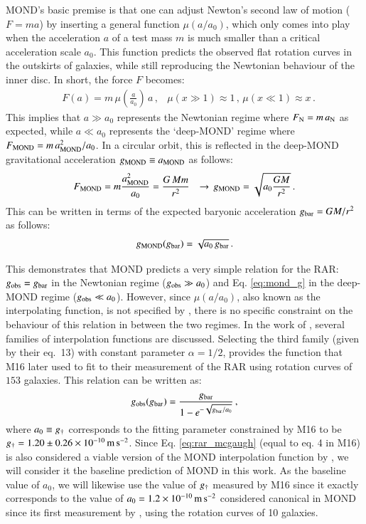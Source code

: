 \documentclass{aa}
\newcommand{\mpss}{\,{\rm m}\,{\rm s}^{-2} }
\newcommand*{\E}[1]{\times 10^{#1}}
\newcommand{\un}[1]{_{\rm #1}}
\begin{document}
MOND's basic premise is that one can adjust Newton's second law of motion ($F=ma$) by inserting a general function $\mu(a/a_0)$, which only comes into play when the acceleration $a$ of a test mass $m$ is much smaller than a critical acceleration scale $a_0$. This function predicts the observed flat rotation curves in the outskirts of galaxies, while still reproducing the Newtonian behaviour of the inner disc. In short, the force $F$ becomes:
\begin{align}\label{eq:mond_f}
& F(a) = m \, \mu \left( \frac{a}{a_0} \right) \, a \, ,
& \mu(x \gg 1) \approx 1 \, , \, \mu(x \ll 1) \approx x \, .
\end{align}
This implies that $a\gg a_0$ represents the Newtonian regime where $F\un{N} = m \, a\un{N}$ as expected, while $a \ll a_0$ represents the `deep-MOND' regime where $F\un{MOND} = m \, a\un{MOND}^2/a_0$. In a circular orbit, this is reflected in the deep-MOND gravitational acceleration $g\un{MOND} \equiv a\un{MOND}$ as follows:
\begin{align}\label{eq:mond_g}
& F\un{MOND} = m \frac{a\un{MOND}^2}{a_0} = \frac{G \, M m}{r^2}
& \rightarrow \,  g\un{MOND} = \sqrt{a_0 \frac{G M}{r^2}} \, .
\end{align}
This can be written in terms of the expected baryonic acceleration $g\un{bar}=GM/r^2$ as follows:
\begin{equation}
g\un{MOND}(g\un{bar}) = \sqrt{a_0 \, g\un{bar}} \, .
\end{equation}

This demonstrates that MOND predicts a very simple relation for the RAR: $g\un{obs}=g\un{bar}$ in the Newtonian regime ($g\un{obs} \gg a_0$) and Eq. \ref{eq:mond_g} in the deep-MOND regime ($g\un{obs} \ll a_0$). However, since $\mu(a/a_0)$, also known as the interpolating function, is not specified by \cite{milgrom1983}, there is no specific constraint on the behaviour of this relation in between the two regimes. In the work of \cite{milgrom2008}, several families of interpolation functions are discussed. Selecting the third family (given by their eq.~13) with constant parameter $\alpha=1/2$, provides the function that M16 later used to fit to their measurement of the RAR using rotation curves of $153$ galaxies. This relation can be written as:
\begin{equation}\label{eq:rar_mcgaugh}
g\un{obs}(g\un{bar}) = \frac{g\un{bar}}{1 - e^{-\sqrt{g\un{bar}/a_0}}} \, ,
\end{equation}
where $a_0 \equiv g\un{\dagger}$ corresponds to the fitting parameter constrained by M16 to be $g\un{\dagger}=1.20\pm0.26\E{-10} \mpss$. Since Eq. \ref{eq:rar_mcgaugh} (equal to eq. 4 in M16) is also considered a viable version of the MOND interpolation function by \cite{milgrom2008}, we will consider it the baseline prediction of MOND in this work. As the baseline value of $a_0$, we will likewise use the value of $g\un{\dagger}$ measured by M16 since it exactly corresponds to the value of $a_0=1.2\E{-10} \mpss$ considered canonical in MOND since its first measurement by \cite{begeman1991}, using the rotation curves of 10 galaxies.
\end{document}
